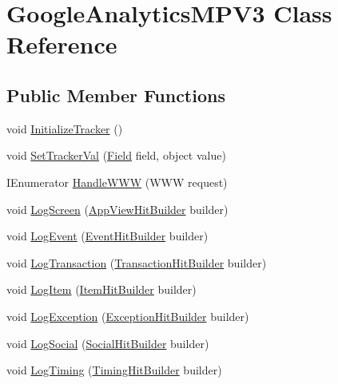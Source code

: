 \hypertarget{class_google_analytics_m_p_v3}{}\section{Google\+Analytics\+M\+P\+V3 Class Reference}
\label{class_google_analytics_m_p_v3}
\subsection*{Public Member Functions}
\begin{DoxyCompactItemize}
\item 
void \hyperlink{class_google_analytics_m_p_v3_adb2992888ce5ba3d8ecef7bbe1dd0944}{Initialize\+Tracker} ()
\item 
void \hyperlink{class_google_analytics_m_p_v3_aa63e30b7b7f689242fbaaf1c55ada23a}{Set\+Tracker\+Val} (\hyperlink{class_field}{Field} field, object value)
\item 
I\+Enumerator \hyperlink{class_google_analytics_m_p_v3_ab529db7371a4b8d5d1ae18af2ce1f94d}{Handle\+W\+WW} (W\+WW request)
\item 
void \hyperlink{class_google_analytics_m_p_v3_a8465e63fa02c2c1413d3a1e24f9b0548}{Log\+Screen} (\hyperlink{class_app_view_hit_builder}{App\+View\+Hit\+Builder} builder)
\item 
void \hyperlink{class_google_analytics_m_p_v3_a350ced4411f75f383670d7cd9fb55ca4}{Log\+Event} (\hyperlink{class_event_hit_builder}{Event\+Hit\+Builder} builder)
\item 
void \hyperlink{class_google_analytics_m_p_v3_aa2594bd070308b7bdbafb23d0349d24d}{Log\+Transaction} (\hyperlink{class_transaction_hit_builder}{Transaction\+Hit\+Builder} builder)
\item 
void \hyperlink{class_google_analytics_m_p_v3_ae67722dc321d680821c3f15284eb8942}{Log\+Item} (\hyperlink{class_item_hit_builder}{Item\+Hit\+Builder} builder)
\item 
void \hyperlink{class_google_analytics_m_p_v3_a63f189d886bd0ebfcbe9102b16f9d634}{Log\+Exception} (\hyperlink{class_exception_hit_builder}{Exception\+Hit\+Builder} builder)
\item 
void \hyperlink{class_google_analytics_m_p_v3_a7abb6d53c68e3cba6bbd5cf3423b10a6}{Log\+Social} (\hyperlink{class_social_hit_builder}{Social\+Hit\+Builder} builder)
\item 
void \hyperlink{class_google_analytics_m_p_v3_a41d4eedd34170215310c7b628225a3e2}{Log\+Timing} (\hyperlink{class_timing_hit_builder}{Timing\+Hit\+Builder} builder)

\end{DoxyCompactItemize}

